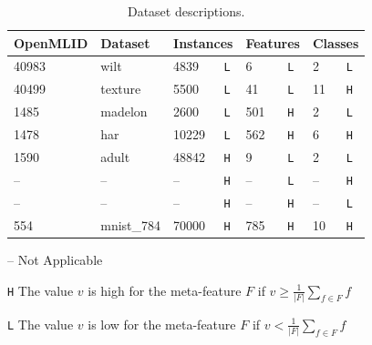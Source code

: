 \begin{table}[t]
    \caption{Dataset descriptions.}
    \footnotesize
    \label{hamlet-tbl:meta_features}
    \begin{threeparttable}
    \centering
        \begin{tabular}{ll|ll|ll|ll}
            \toprule
             \textbf{OpenMLID} & \textbf{Dataset} & \multicolumn{2}{c}{\textbf{Instances}} & \multicolumn{2}{c}{\textbf{Features}} & \multicolumn{2}{c}{\textbf{Classes}}  \\ \midrule
             40983 & wilt & 4839 & \footnotesize{\texttt{L}} & 6 & \footnotesize{\texttt{L}} & 2 & \footnotesize{\texttt{L}}\\
             40499 & texture & 5500& \footnotesize{\texttt{L}} & 41& \footnotesize{\texttt{L}} & 11& \footnotesize{\texttt{H}}\\
             1485 & madelon & 2600 & \footnotesize{\texttt{L}} & 501 & \footnotesize{\texttt{H}} & 2 & \footnotesize{\texttt{L}}\\
             1478 & har & 10229 & \footnotesize{\texttt{L}} & 562& \footnotesize{\texttt{H}} & 6& \footnotesize{\texttt{H}}\\
             1590 & adult & 48842& \footnotesize{\texttt{H}} & 9& \footnotesize{\texttt{L}} & 2& \footnotesize{\texttt{L}}\\
             -- & -- & -- & \footnotesize{\texttt{H}} & -- & \footnotesize{\texttt{L}} & -- & \footnotesize{\texttt{H}}\\%
             -- & -- & -- & \footnotesize{\texttt{H}} & -- & \footnotesize{\texttt{H}} & -- & \footnotesize{\texttt{L}}\\%
             554 & mnist\_784 & 70000& \footnotesize{\texttt{H}} & 785& \footnotesize{\texttt{H}} & 10& \footnotesize{\texttt{H}}\\%
             \bottomrule
        \end{tabular}
        \label{hamlet-tbl:datasets}
        \begin{tablenotes}
            \item[--] {\footnotesize Not Applicable}
            \item[\texttt{H}] {\footnotesize The value $v$ is high for the meta-feature $F$ if $ v \geq \frac{1}{|F|}\sum_{f \in F} f$}
            \item[\texttt{L}] {\footnotesize The value $v$ is low for the meta-feature $F$ if $v < \frac{1}{|F|}\sum_{f \in F} f$}
        \end{tablenotes}
    \end{threeparttable}
\end{table}

